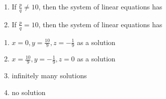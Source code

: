 \begin{enumerate}    [label=\thesubsection.\arabic*, ref=\thesubsection.\theenumi]
\begin{multicols}{2}
\begin{enumerate}[label=(\Roman*)]
\item      If $ \frac{p}{q} \neq 10 $, then the system of linear equations has 
\item      If $ \frac{p}{q} = 10 $, then the system of linear equations has 
\end{enumerate}
\columnbreak
					\begin{enumerate}[label=(\Alph*)]		
\item     $ x = 0,  y = \frac{10}{9}, z = -\frac{1}{9} $ as a solution  
\item     $ x = \frac{10}{9},  y = -\frac{1}{9},  z = 0 $ as a solution 
\item     infinitely many solutions                               
\item     no solution 
\end{enumerate}
                                         \end{multicols} 


\end{enumerate}
